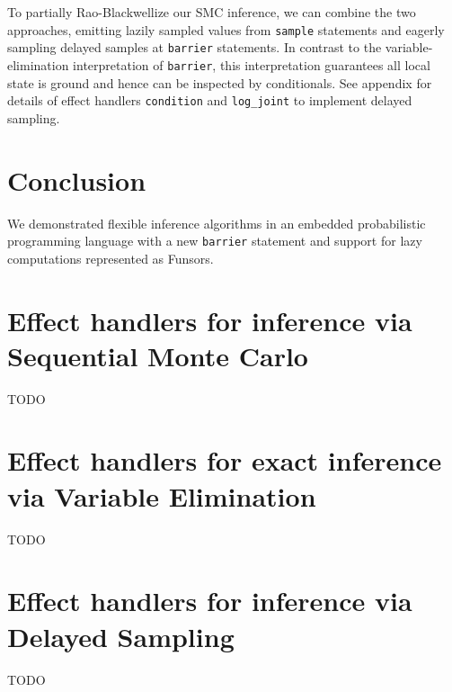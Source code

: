 \documentclass[anonymous=false, %
               format=acmsmall, %
               review=true, %
               screen=true, %
               nonacm=true]{acmart}
\begin{document}
To partially Rao-Blackwellize our SMC inference, we can combine the two approaches, emitting lazily sampled values from \verb$sample$ statements and eagerly sampling delayed samples at \verb$barrier$ statements.
In contrast to the variable-elimination interpretation of \verb$barrier$, this interpretation guarantees all local state is ground and hence can be inspected by conditionals.
See appendix \label{sec:appendix:delayed} for details of effect handlers \verb$condition$ and \verb$log_joint$ to implement delayed sampling.

\section{Conclusion}

We demonstrated flexible inference algorithms in an embedded probabilistic programming language with a new \verb$barrier$ statement and support for lazy computations represented as Funsors.





\section{Effect handlers for inference via Sequential Monte Carlo}
\label{sec:appendix:smc}
TODO

\section{Effect handlers for exact inference via Variable Elimination}
\label{sec:appendix:exact}
TODO

\section{Effect handlers for inference via Delayed Sampling}
\label{sec:appendix:delayed}
TODO
\end{document}
